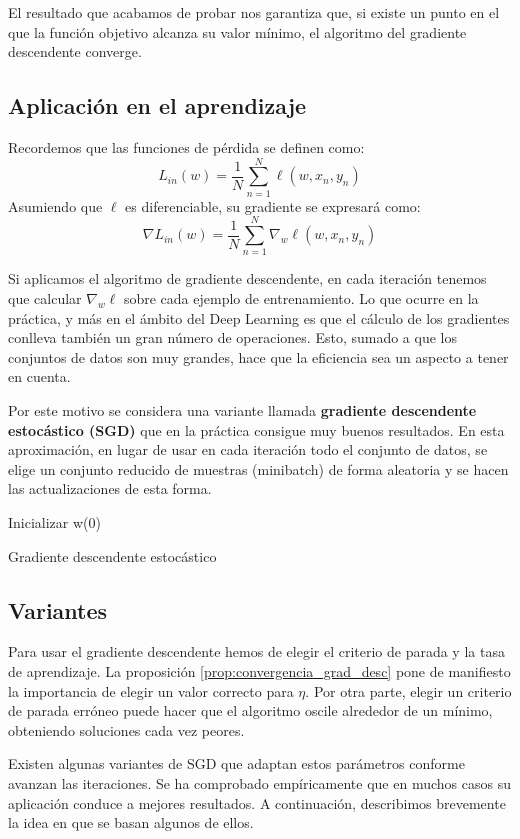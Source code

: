 El resultado que acabamos de probar nos garantiza que, si existe un punto en el que la función objetivo alcanza su valor mínimo, el algoritmo del gradiente descendente converge.

\subsection{Aplicación en el aprendizaje}
Recordemos que las funciones de pérdida se definen como:
$$ L_{in}(w) = \dfrac{1}{N} \sum_{n=1}^{N} \ell(w, x_n, y_n)$$ 
Asumiendo que $\ell$ es diferenciable, su gradiente se expresará como:
$$ \nabla L_{in}(w) = \dfrac{1}{N} \sum_{n=1}^{N} \nabla_w \ell(w, x_n, y_n) $$

Si aplicamos el algoritmo de gradiente descendente, en cada iteración tenemos que calcular $\nabla_w \ell$ sobre cada ejemplo de entrenamiento. Lo que ocurre en la práctica, y más en el ámbito del Deep Learning es que el cálculo de los gradientes conlleva también un gran número de operaciones. Esto, sumado a que los conjuntos de datos son muy grandes, hace que la eficiencia sea un aspecto a tener en cuenta.

Por este motivo se considera una variante llamada \textbf{gradiente descendente estocástico (SGD)} que en la práctica consigue muy buenos resultados. En esta aproximación, en lugar de usar en cada iteración todo el conjunto de datos, se elige un conjunto reducido de muestras (minibatch) de forma aleatoria y se hacen las actualizaciones de esta forma. 

\begin{algorithm}
	\SetAlgoLined
	Inicializar w(0)\\ 
	\caption{Gradiente descendente estocástico}
\end{algorithm}

\subsection{Variantes}
Para usar el gradiente descendente hemos de elegir el criterio de parada y la tasa de aprendizaje. La proposición \ref{prop:convergencia_grad_desc} pone de manifiesto la importancia de elegir un valor correcto para $\eta$. Por otra parte, elegir un criterio de parada erróneo puede hacer que el algoritmo oscile alrededor de un mínimo, obteniendo soluciones cada vez peores.

Existen algunas variantes de SGD que adaptan estos parámetros conforme avanzan las iteraciones. Se ha comprobado empíricamente que en muchos casos su aplicación conduce a mejores resultados. A continuación, describimos brevemente la idea en que se basan algunos de ellos. 




